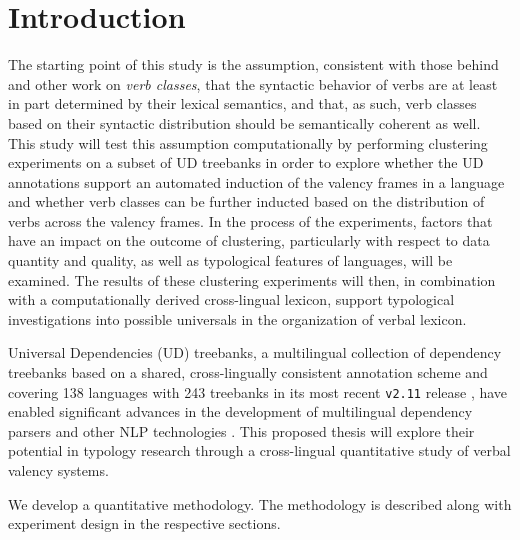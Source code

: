 \chapter{Introduction}

The starting point of this study is the assumption, consistent with those behind \citet{levin1993} and other work on \textit{verb classes}, that the syntactic behavior of verbs are at least in part determined by their lexical semantics, and that, as such, verb classes based on their syntactic distribution should be semantically coherent as well. This study will test this assumption computationally by performing clustering experiments on a subset of UD treebanks in order to explore whether the UD annotations support an automated induction of the valency frames in a language and whether verb classes can be further inducted based on the distribution of verbs across the valency frames. In the process of the experiments, factors that have an impact on the outcome of clustering, particularly with respect to data quantity and quality, as well as typological features of languages, will be examined. The results of these clustering experiments will then, in combination with a computationally derived cross-lingual lexicon, support typological investigations into possible universals in the organization of verbal lexicon.



Universal Dependencies (UD) treebanks, a multilingual collection of dependency treebanks based on a shared, cross-lingually consistent annotation scheme \citep{nivre2020} and covering 138 languages with 243 treebanks in its most recent \texttt{v2.11} release \citep{universaldep}, have enabled significant advances in the development of multilingual dependency parsers and other NLP technologies \citep{zeman2017, zeman2018}. This proposed thesis will explore their potential in typology research through a cross-lingual quantitative study of verbal valency systems.

We develop a quantitative methodology. The methodology is described along with experiment design in the respective sections.